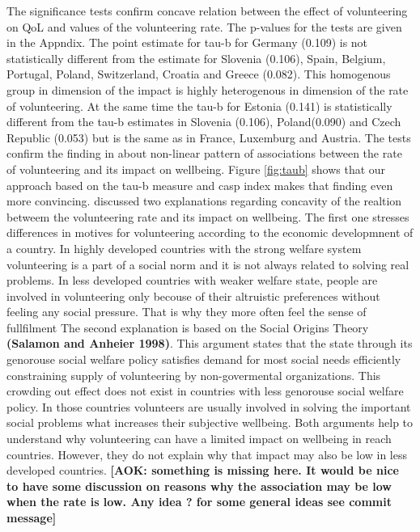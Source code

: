 \documentclass[10pt, letterpaper]{article}
\begin{document}
\begin{spacing}{1.4}
 The significance tests confirm concave relation between the effect of volunteering on QoL and values of the volunteering rate. The p-values for the tests are given in the Appndix.  The point estimate for tau-b for Germany (0.109) is not statistically different from the estimate for Slovenia (0.106), Spain, Belgium, Portugal, Poland, Switzerland, Croatia and Greece (0.082). This homogenous group in dimension of the impact is highly heterogenous in dimension of the rate of volunteering. At the same time the tau-b for Estonia (0.141) is statistically different from the tau-b estimates in Slovenia (0.106), Poland(0.090) and Czech Republic (0.053) but  is the same as in France, Luxemburg and Austria. The tests confirm the finding in \citet{haski09} about non-linear pattern of associations between  the rate of volunteering and its impact on wellbeing. Figure \ref{fig:taub} shows that our approach based on the tau-b measure and casp index makes that finding even more convincing. \citet{haski09} discussed two explanations regarding concavity of the realtion betweem the volunteering rate and its impact on wellbeing. The first one stresses differences in motives for volunteering according to the economic developmnent of a country. In highly developed countries with the strong welfare system volunteering is a part of a social norm and it is not always related to solving real problems. In less developed countries with weaker welfare state, people are involved in volunteering only becouse of their altruistic preferences without feeling any social pressure. That is why they more often feel the sense of fullfilment  The second explanation is based on the Social Origins Theory \textbf{(Salamon and Anheier 1998)}. This argument states that the state through its genorouse social welfare policy satisfies demand for most social needs efficiently constraining supply of volunteering by non-govermental organizations. This crowding out effect does not exist in countries with less genorouse social welfare policy. In those countries volunteers are usually involved in solving the important social problems what increases their subjective wellbeing. Both arguments help to understand why volunteering can have a limited impact on wellbeing in reach countries. However, they do not explain why that impact may also be low in less developed countries. \textbf{[AOK: something is missing here. It would be nice to have some discussion on reasons why the association may be low when the rate is low. Any idea ? for some general ideas see commit message]} \\


\end{spacing}
\end{document}
